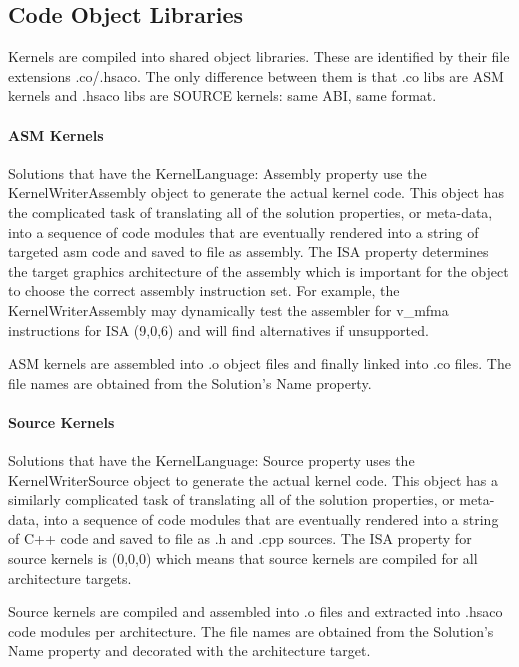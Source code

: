 \documentclass[]{article}
\begin{document}
\subsection{Code Object Libraries}

Kernels are compiled into shared object libraries. These are identified by their file extensions .co/.hsaco. The only difference between them is that .co libs are ASM kernels and .hsaco libs are SOURCE kernels: same ABI, same format.

\paragraph{ASM Kernels}

Solutions that have the KernelLanguage: Assembly property use the KernelWriterAssembly object to generate the actual kernel code. This object has the complicated task of translating all of the solution properties, or meta-data, into a sequence of code modules that are eventually rendered into a string of targeted asm code and saved to file as assembly. The ISA property determines the target graphics architecture of the assembly which is important for the object to choose the correct assembly instruction set. For example, the KernelWriterAssembly may dynamically test the assembler for v\_mfma instructions for ISA (9,0,6) and will find alternatives if unsupported.

ASM kernels are assembled into .o object files and finally linked into .co files. The file names are obtained from the Solution's Name property.

\paragraph{Source Kernels}

Solutions that have the KernelLanguage: Source property uses the KernelWriterSource object to generate the actual kernel code. This object has a similarly complicated task of translating all of the solution properties, or meta-data, into a sequence of code modules that are eventually rendered into a string of C++ code and saved to file as .h and .cpp sources. The ISA property for source kernels is (0,0,0) which means that source kernels are compiled for all architecture targets.

Source kernels are compiled and assembled into .o files and extracted into .hsaco code modules per architecture. The file names are obtained from the Solution's Name property and decorated with the architecture target.
\end{document}
